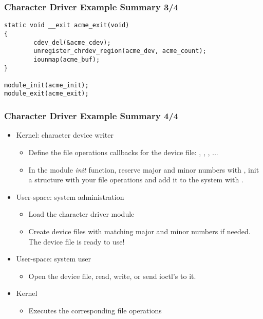 \begin{frame}[fragile]
  \frametitle{Character Driver Example Summary 3/4}
\begin{verbatim}
static void __exit acme_exit(void)
{
        cdev_del(&acme_cdev);
        unregister_chrdev_region(acme_dev, acme_count);
        iounmap(acme_buf);
}

module_init(acme_init);
module_exit(acme_exit);    
\end{verbatim}
\end{frame}

\begin{frame}
\frametitle{Character Driver Example Summary 4/4}
  \begin{itemize}
  \item Kernel: character device writer
    \begin{itemize}
    \item Define the file operations callbacks for the device file:
      , , , ...
    \item In the module \emph{init} function, reserve major and minor numbers
      with , init a 
      structure with your file operations and add it to the system
      with .
    \end{itemize}
  \item User-space: system administration
    \begin{itemize}
    \item Load the character driver module
    \item Create device files with matching major and minor numbers if
      needed. The device file is ready to use!
    \end{itemize}
  \item User-space: system user
    \begin{itemize}
    \item Open the device file, read, write, or send ioctl's to it.
    \end{itemize}
  \item Kernel
    \begin{itemize}
    \item Executes the corresponding file operations
    \end{itemize}
  \end{itemize}
\end{frame}
